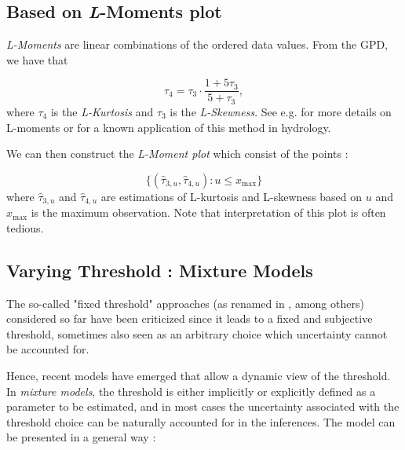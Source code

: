 \subsection*{Based on \emph{L}-Moments plot}

\emph{L-Moments} are linear combinations of the ordered data values. 
From the GPD, we have that

\begin{equation}
\tau_4=\tau_3\cdot \frac{1+5\tau_3}{5+\tau_3},
\end{equation}
where $\tau_4$ is the \emph{L-Kurtosis} and $\tau_3$ is the \emph{L-Skewness}. See e.g. \citet{hosking_regional_1997} for more details on L-moments or \citet{peel_utility_2001} for a known application of this method in hydrology.

We can then construct the \emph{L-Moment plot} which consist of the points :

\begin{equation}
\Big\{(\hat{\tau}_{3,u},\hat{\tau}_{4,u}) : u\leq x_{\text{max}}\Big\}
\end{equation}
where $\hat{\tau}_{3,u}$ and $\hat{\tau}_{4,u}$ are estimations of L-kurtosis and L-skewness based on $u$ and $x_{\text{max}}$ is the maximum observation. Note that interpretation of this plot is often tedious.






\subsection{Varying Threshold : Mixture Models}

The so-called "fixed threshold" approaches (as renamed in 
\citet{scarrott_review_2012}, among others) considered so far have been criticized since it leads to a fixed and subjective threshold, sometimes also seen as an arbitrary choice which uncertainty cannot be accounted for. 



Hence, recent models have emerged that allow a dynamic view of the threshold. In \textit{mixture models}, the threshold is either implicitly or explicitly defined as a parameter to be estimated, and in most cases the uncertainty associated with the threshold choice can be naturally accounted for in the inferences. The model can be presented in a general way : 

